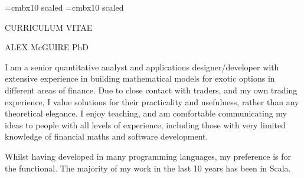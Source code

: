 \font\titlesize=cmbx10 scaled
\font\namesize=cmbx10 scaled
\vsize=10in
\hsize=8in
\voffset -0.4in
\hoffset -0.9in
\vskip 1cm

\centerline{\titlesize CURRICULUM VITAE}
\vskip 0.4in
\centerline{\namesize ALEX McGUIRE PhD}
\vskip 0.2in
\def\jobskip{\noalign{\bigskip}}
\def\posskip{\noalign{\medskip}}
\midinsert
\narrower\narrower\narrower
I am a senior quantitative analyst and applications designer/developer with extensive experience in building mathematical models for exotic options in 
different areas of finance. Due to close contact with traders, and my own trading experience, I value
solutions for their practicality and usefulness, rather than any theoretical elegance. I enjoy teaching, and am comfortable communicating my ideas to people with all
levels of experience, including those with very limited knowledge of financial maths and software development.

Whilst having developed in many programming languages, my preference is for the functional. The majority of my work in the last 10 years has been in Scala.
\endinsert


